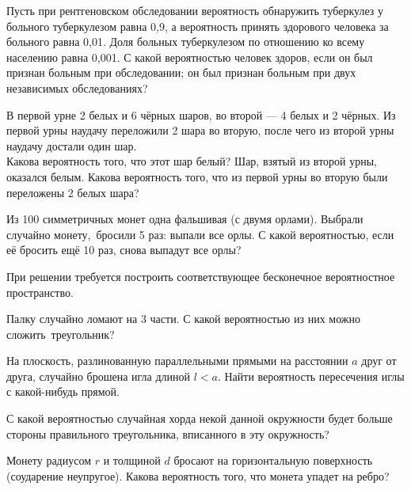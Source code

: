 \documentclass[a4paper,12pt]{article}
\begin{document}


Пусть при рентгеновском обследовании вероятность обнаружить туберкулез у больного туберкулезом равна 0,9, а вероятность принять здорового человека за больного равна 0,01. Доля больных туберкулезом по отношению ко всему населению равна 0,001.
С какой вероятностью человек здоров, если  он был признан больным при обследовании;
он был признан больным при двух независимых обследованиях?

    В первой урне 2 белых и 6 чёрных шаров, во второй --- 4 белых и 2 чёрных. Из первой урны наудачу переложили 2 шара во вторую, после чего из второй урны наудачу достали один шар.\\
        Какова вероятность того, что этот шар белый?
        Шар, взятый из второй урны, оказался белым. Какова вероятность того, что из первой урны во вторую были переложены 2 белых шара?



    Из 100 симметричных монет одна фальшивая (с двумя орлами).
    Выбрали случайно монету,~бросили 5 раз: выпали все орлы.
    С какой вероятностью,  если её бросить ещё 10 раз, снова выпадут все орлы?


\noindent
При решении требуется построить соответствующее бесконечное
вероятностное пространство.

Палку случайно ломают на 3 части. С какой вероятностью из них можно сложить~треугольник?

На плоскость, разлинованную параллельными прямыми на расстоянии
$a$ друг от друга, случайно брошена игла длиной $l<a$. Найти вероятность
пересечения иглы с какой-нибудь прямой.

С какой вероятностью случайная хорда некой данной окружности будет больше
стороны правильного треугольника, вписанного в эту окружность?

Монету радиусом $r$ и толщиной $d$
бросают на горизонтальную поверхность (соударение неупругое).
Какова вероятность того, что монета упадет на ребро? %


\end{document}
